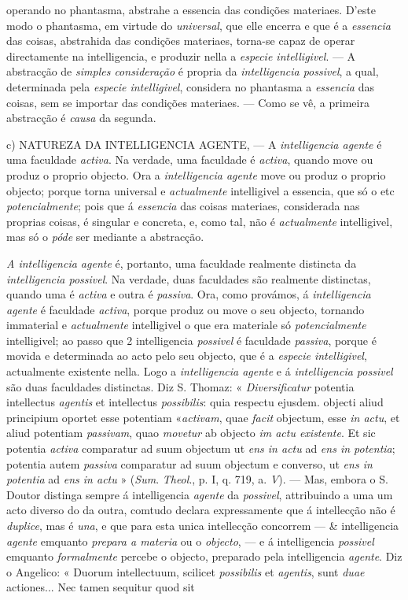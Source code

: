 operando no phantasma, abstrahe a essencia das condições materiaes. D'este modo o phantasma, em virtude do \emph{universal}, que elle encerra e que é a \emph{essencia} das coisas, abstrahida das condições materiaes, torna-se capaz de operar directamente na intelligencia, e produzir nella a \emph{especie intelligivel}. --- A abstracção de \emph{simples consideração} é propria da \emph{intelligencia possivel}, a qual, determinada pela \emph{especie intelligivel}, considera no phantasma a \emph{essencia} das coisas, sem se importar das condições materiaes. --- Como se vê, a primeira abstracção é \emph{causa} da segunda.\par c) \textsc{NATUREZA} DA INTELLIGENCIA AGENTE, --- A \emph{intelligencia agente} é uma faculdade \emph{activa}. Na verdade, uma faculdade é \emph{activa}, quando move ou produz o proprio objecto. Ora a \emph{intelligencia agente} move ou produz o proprio objecto; porque torna universal e \emph{actualmente} intelligivel a essencia, que só o etc \emph{potencialmente}; pois que á \emph{essencia} das coisas materiaes, considerada nas proprias coisas, é singular e concreta, e, como tal, não é \emph{actualmente} intelligivel, mas só o \emph{póde} ser mediante a abstracção.\par \emph{A intelligencia agente} é, portanto, uma faculdade realmente distincta da \emph{intelligencia possivel}. Na verdade, duas faculdades são realmente distinctas, quando uma é \emph{activa} e outra é \emph{passiva}. Ora, como provámos, á \emph{intelligencia agente} é faculdade \emph{activa}, porque produz ou move o seu objecto, tornando immaterial e \emph{actualmente} intelligivel o que era materiale só \emph{potencialmente} intelligivel; ao passo que 2 intelligencia \emph{possivel} é faculdade \emph{passiva}, porque é movida e determinada ao acto pelo seu objecto, que é a \emph{especie intelligivel}, actualmente existente nella. Logo a \emph{intelligencia agente} e á \emph{intelligencia possivel} são duas faculdades distinctas. Diz S. Thomaz: « \emph{Diversificatur} potentia intellectus \emph{agentis} et intellectus \emph{possibilis}: quia respectu ejusdem. objecti aliud principium oportet esse potentiam «\emph{activam}, quae \emph{facit} objectum, esse \emph{in actu}, et aliud potentiam \emph{passivam}, quao \emph{movetur} ab objecto \emph{im actu existente}. Et sic potentia \emph{activa} comparatur ad suum objectum ut \emph{ens in actu} ad \emph{ens in potentia}; potentia autem \emph{passiva} comparatur ad suum objectum e converso, ut \emph{ens in potentia} ad \emph{ens in actu} » (\emph{Sum}. \emph{Theol}., p. I, q. 719, a. \emph{V}). --- Mas, embora o S. Doutor distinga sempre á intelligencia \emph{agente} da \emph{possivel}, attribuindo a uma um acto diverso do da outra, comtudo declara expressamente que á intellecção não é \emph{duplice}, mas é \emph{una}, e que para esta unica intellecção concorrem --- \& intelligencia \emph{agente} emquanto \emph{prepara a materia} ou o \emph{objecto}, --- e á intelligencia \emph{possivel} emquanto \emph{formalmente} percebe o objecto, preparado pela intelligencia \emph{agente}. Diz o Angelico: « Duorum intellectuum, scilicet \emph{possibilis} et \emph{agentis}, sunt \emph{duae} actiones... Nec tamen sequitur quod sit 
